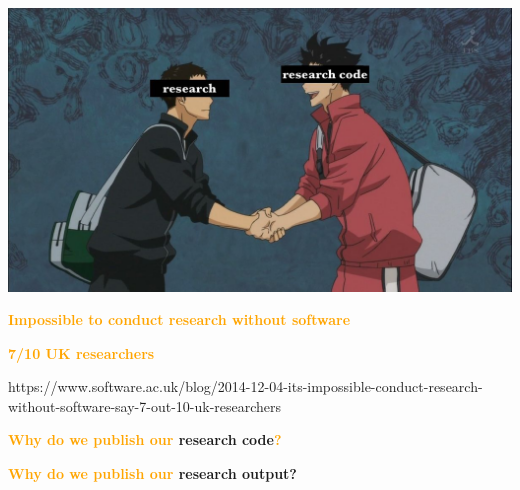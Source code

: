 \documentclass{beamer}
\begin{document}
\begin{frame}
    \begin{center}
    \includegraphics[width=\textwidth]{static/research_and_software.jpg}\hspace{8pt}
    \end{center}
\end{frame}

\begin{frame}
    \centering
    \Large{\textbf{\textcolor{orange}{Impossible to conduct research without software}}} \\
    \vspace{.3cm}

    \LARGE{\textbf{\textcolor{orange}{7/10 UK researchers}}}
    \vspace{2cm}

    \tiny{https://www.software.ac.uk/blog/2014-12-04-its-impossible-conduct-research-without-software-say-7-out-10-uk-researchers}
\end{frame}

\begin{frame}
    \centering
    \Large{\textbf{\textcolor{orange}{Why do we publish our} research code\textcolor{orange}{?}}}
\end{frame}


\begin{frame}
    \centering
    \Large{\textbf{\textcolor{orange}{Why do we publish our} research output?}}
\end{frame}

\end{document}
